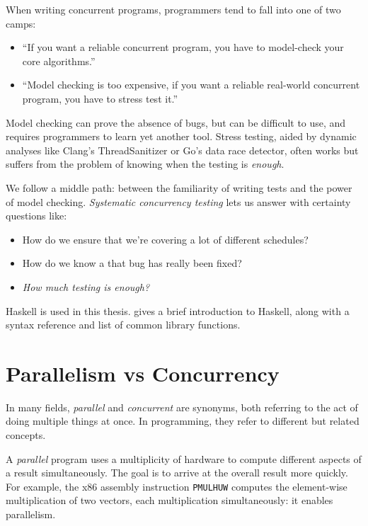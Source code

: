 When writing concurrent programs, programmers tend to fall into one of two
camps:

\begin{itemize}
\item ``If you want a reliable concurrent program, you have to model-check your
core algorithms.''
\item ``Model checking is too expensive, if you want a reliable real-world
concurrent program, you have to stress test it.''
\end{itemize}

Model checking can prove the absence of bugs, but can be difficult to use, and
requires programmers to learn yet another tool.  Stress testing, aided by
dynamic analyses like Clang's ThreadSanitizer or Go's data race detector, often
works but suffers from the problem of knowing when the testing is \emph{enough}.

We follow a middle path: between the familiarity of writing tests and the power
of model checking.  \emph{Systematic concurrency testing} lets us answer with
certainty questions like:

\begin{itemize}
\item How do we ensure that we're covering a lot of different schedules?
\item How do we know a that bug has really been fixed?
\item \emph{How much testing is enough?}
\end{itemize}

Haskell is used in this thesis.   gives a brief introduction to
Haskell, along with a syntax reference and list of common library functions.

\section{Parallelism vs Concurrency}
\label{sec:intro-parconc}

In many fields, \emph{parallel} and \emph{concurrent} are synonyms, both
referring to the act of doing multiple things at once.  In programming, they
refer to different but related concepts.

A \emph{parallel} program uses a multiplicity of hardware to compute different
aspects of a result simultaneously.  The goal is to arrive at the overall result
more quickly.  For example, the x86 assembly instruction \verb#PMULHUW# computes
the element-wise multiplication of two vectors, each multiplication
simultaneously: it enables parallelism.

